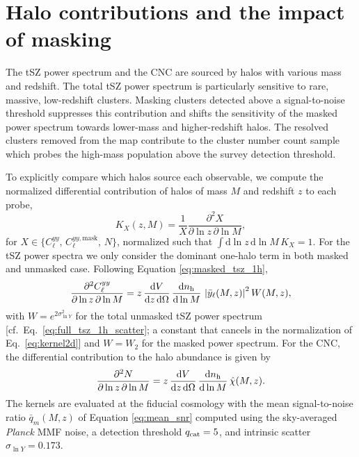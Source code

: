 \documentclass[aps,prd,twocolumn,superscriptaddress,nofootinbib,floatfix]{revtex4-2}
\begin{document}
\section{Halo contributions and the impact of masking}
\label{sec:kernels}
The tSZ power spectrum and the CNC are sourced by halos with various mass and redshift. The total tSZ power spectrum is particularly sensitive to rare, massive, low-redshift clusters. Masking clusters detected above a signal-to-noise threshold suppresses this contribution and shifts the sensitivity of the masked power spectrum towards lower-mass and higher-redshift halos. The resolved clusters removed from the map contribute to the cluster number count sample which probes the high-mass population above the survey detection threshold.

To explicitly compare which halos source each observable, we compute the
normalized differential contribution of halos of mass $M$ and redshift $z$
to each probe,
\begin{equation}
K_X(z,M)
=
\frac{1}{X}
\frac{\partial^2 X}
{\partial\ln z\,\partial\ln M},
\label{eq:kernel2d}
\end{equation}
for $X\in\{C_\ell^{yy},\,C_\ell^{yy,\mathrm{mask}},\,N\}$, normalized such
that $\int\mathrm{d}\ln z\,\mathrm{d}\ln M\,K_X=1$. For the tSZ power spectra we only consider the dominant one-halo term in both masked and unmasked case. Following Equation \ref{eq:masked_tsz_1h},
\begin{equation}
\frac{\partial^2 C_\ell^{yy}}
{\partial\ln z\,\partial\ln M}
=
z\,
\frac{\mathrm{d}V}{\mathrm{d}z\,\mathrm{d}\Omega}\,
\frac{\mathrm{d}n_{\rm h}}{\mathrm{d}\ln M}\,
\left|\bar y_\ell(M,z)\right|^2
W(M,z),
\label{eq:kernel2d_ps}
\end{equation}
with $W=e^{2\sigma_{\ln Y}^{2}}$ for the total unmasked tSZ power spectrum
[cf.\ Eq.~\eqref{eq:full_tsz_1h_scatter}; a constant that cancels in
the normalization of Eq.~\eqref{eq:kernel2d}] and $W=W_2$ for the
masked power spectrum. For the CNC, the differential contribution to the halo abundance is given by
\begin{equation}
\frac{\partial^2 N}
{\partial\ln z\,\partial\ln M}
=
z\,
\frac{\mathrm{d}V}{\mathrm{d}z\,\mathrm{d}\Omega}\,
\frac{\mathrm{d}n_{\rm h}}{\mathrm{d}\ln M}\,
\hat{\chi}(M,z).
\label{eq:kernel2d_cnc}
\end{equation}
The kernels are evaluated at the fiducial cosmology with the mean
signal-to-noise ratio $\bar q_m(M,z)$ of Equation \ref{eq:mean_snr} computed
using the sky-averaged \textit{Planck} MMF noise, a detection threshold
$q_{\rm cat}=5$, and intrinsic scatter $\sigma_{\ln Y}=0.173$.
\end{document}

